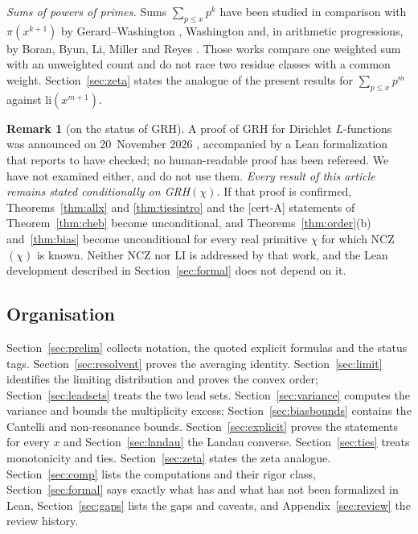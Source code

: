 \documentclass[11pt]{amsart}
\theoremstyle{definition}
\newtheorem{remark}[theorem]{Remark}
\numberwithin{equation}{section}
\newcommand{\certA}{\textsf{[cert-A]}}
\begin{document}
\emph{Sums of powers of primes.} Sums $\sum_{p\le x}p^k$ have been
studied in comparison with $\pi(x^{k+1})$ by Gerard--Washington
\cite{GW18}, Washington \cite{Was24} and, in arithmetic progressions,
by Boran, Byun, Li, Miller and Reyes \cite{BBLMR24}. Those works
compare one weighted sum with an unweighted count and do not race two
residue classes with a common weight. Section~\ref{sec:zeta} states
the analogue of the present results for $\sum_{p\le x}p^m$ against
$\mathrm{li}(x^{m+1})$.

\begin{remark}[on the status of GRH]\label{rem:GRHstatus}
A proof of GRH for Dirichlet $L$-functions was announced on
20~November 2026 \cite{Alp26}, accompanied by a Lean formalization
that \cite{Lean26} reports to have checked; no human-readable proof
has been refereed. We have not examined either, and do not use them.
\emph{Every result of this article remains stated conditionally on
GRH$(\chi)$.} If that proof is confirmed,
Theorems~\ref{thm:allx} and \ref{thm:tiesintro} and the \certA{}
statements of Theorem~\ref{thm:cheb} become unconditional, and
Theorems~\ref{thm:order}(b) and~\ref{thm:bias} become unconditional
for every real primitive $\chi$ for which NCZ$(\chi)$ is known.
Neither NCZ nor LI is addressed by that work, and the Lean
development described in Section~\ref{sec:formal} does not depend on
it.
\end{remark}

\subsection{Organisation}
Section~\ref{sec:prelim} collects notation, the quoted explicit
formulas and the status tags. Section~\ref{sec:resolvent} proves the
averaging identity. Section~\ref{sec:limit} identifies the limiting
distribution and proves the convex order;
Section~\ref{sec:leadsets} treats the two lead sets.
Section~\ref{sec:variance} computes the variance and bounds the
multiplicity excess; Section~\ref{sec:biasbounds} contains the
Cantelli and non-resonance bounds. Section~\ref{sec:explicit} proves
the statements for every $x$ and Section~\ref{sec:landau} the Landau
converse. Section~\ref{sec:ties} treats monotonicity and ties.
Section~\ref{sec:zeta} states the zeta analogue.
Section~\ref{sec:comp} lists the computations and their rigor class,
Section~\ref{sec:formal} says exactly what has and what has not been
formalized in Lean, Section~\ref{sec:gaps} lists the gaps and
caveats, and
Appendix~\ref{sec:review} the review history.
\end{document}
